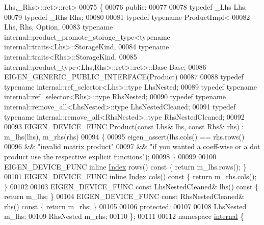\begin{DoxyCode}
      Lhs,\_Rhs>::ret>::ret>
00075 \{
00076   \textcolor{keyword}{public}:
00077     
00078     \textcolor{keyword}{typedef} \_Lhs Lhs;
00079     \textcolor{keyword}{typedef} \_Rhs Rhs;
00080     
00081     \textcolor{keyword}{typedef} \textcolor{keyword}{typename} ProductImpl<
00082         Lhs, Rhs, Option,
00083         \textcolor{keyword}{typename} internal::product\_promote\_storage\_type<typename internal::traits<Lhs>::StorageKind,
00084                                                         \textcolor{keyword}{typename} internal::traits<Rhs>::StorageKind,
00085                                                         internal::product\_type<Lhs,Rhs>::ret>::ret>::Base 
      Base;
00086     EIGEN\_GENERIC\_PUBLIC\_INTERFACE(Product)
00087 
00088     \textcolor{keyword}{typedef} \textcolor{keyword}{typename} internal::ref\_selector<Lhs>::type LhsNested;
00089     \textcolor{keyword}{typedef} \textcolor{keyword}{typename} internal::ref\_selector<Rhs>::type RhsNested;
00090     \textcolor{keyword}{typedef} \textcolor{keyword}{typename} internal::remove\_all<LhsNested>::type LhsNestedCleaned;
00091     \textcolor{keyword}{typedef} \textcolor{keyword}{typename} internal::remove\_all<RhsNested>::type RhsNestedCleaned;
00092 
00093     EIGEN\_DEVICE\_FUNC Product(\textcolor{keyword}{const} Lhs& lhs, \textcolor{keyword}{const} Rhs& rhs) : m\_lhs(lhs), m\_rhs(rhs)
00094     \{
00095       eigen\_assert(lhs.cols() == rhs.rows()
00096         && \textcolor{stringliteral}{"invalid matrix product"}
00097         && \textcolor{stringliteral}{"if you wanted a coeff-wise or a dot product use the respective explicit functions"});
00098     \}
00099 
00100     EIGEN\_DEVICE\_FUNC \textcolor{keyword}{inline} \hyperlink{namespace_eigen_a62e77e0933482dafde8fe197d9a2cfde}{Index} rows()\textcolor{keyword}{ const }\{ \textcolor{keywordflow}{return} m\_lhs.rows(); \}
00101     EIGEN\_DEVICE\_FUNC \textcolor{keyword}{inline} \hyperlink{namespace_eigen_a62e77e0933482dafde8fe197d9a2cfde}{Index} cols()\textcolor{keyword}{ const }\{ \textcolor{keywordflow}{return} m\_rhs.cols(); \}
00102 
00103     EIGEN\_DEVICE\_FUNC \textcolor{keyword}{const} LhsNestedCleaned& lhs()\textcolor{keyword}{ const }\{ \textcolor{keywordflow}{return} m\_lhs; \}
00104     EIGEN\_DEVICE\_FUNC \textcolor{keyword}{const} RhsNestedCleaned& rhs()\textcolor{keyword}{ const }\{ \textcolor{keywordflow}{return} m\_rhs; \}
00105 
00106   \textcolor{keyword}{protected}:
00107 
00108     LhsNested m\_lhs;
00109     RhsNested m\_rhs;
00110 \};
00111 
00112 \textcolor{keyword}{namespace }\hyperlink{namespaceinternal}{internal} \{

\end{DoxyCode}

